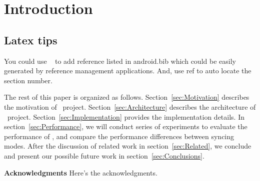\section{Introduction}
\label{sec:Introduction}

\subsection{Latex tips} %
You could use ~\cite{Google:2008} to add reference listed in android.bib 
which could be easily generated by reference management applications.
And, use ref to auto locate the section number.



The rest of this paper is organized as follows.
Section~\ref{sec:Motivation} describes the motivation of \teledroid\ project.
Section~\ref{sec:Architecture} describes the architecture of \teledroid\ project.
Section~\ref{sec:Implementation} provides the implementation details.
In section~\ref{sec:Performance}, we will conduct series of experiments to evaluate the performance of \teledroid, and compare the performance differences between syncing modes. 
After the discussion of related work in section~\ref{sec:Related}, we conclude and present our possible future work 
in section~\ref{sec:Conclusions}.

{\bf Acknowledgments}  Here's the acknowledgments.